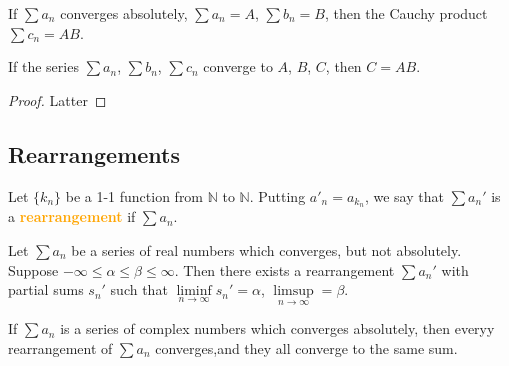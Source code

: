 \begin{theorem}
[pma 3.50]
If $\sum a_n$ converges absolutely, $\sum a_n=A$, $\sum b_n=B$, then the Cauchy product $\sum c_n=AB$.
\end{theorem}
\begin{hardproof}

\end{hardproof}

\begin{theorem}
[pma 3.51]
If the series $\sum a_n$, $\sum b_n$, $\sum c_n$ converge to $A$, $B$, $C$, then $C=AB$.
\end{theorem}
\begin{proof}
Latter
\end{proof}

\subsection{Rearrangements}

\begin{definition}
[pma 3.52]
Let $\{k_n\}$ be a 1-1 function from $\mathbb{N}$ to $\mathbb{N}$. Putting $a'_n=a_{k_n}$, we say that $\sum a_n'$ is a \textbf{\textcolor{orange}{rearrangement}} if $\sum a_n$.
\end{definition}


\begin{theorem}
[pma 3.54]
Let $\sum a_n$ be a series of real numbers which converges, but not absolutely. Suppose $-\infty\leq \alpha\leq \beta\leq \infty$. Then there exists a rearrangement $\sum a_n'$ with partial sums $s_n'$ such that $\liminf\limits_{n\to \infty}s_n'=\alpha$, $\limsup\limits_{n\to \infty}=\beta$.
\end{theorem}
\begin{hardproof}

\end{hardproof}

\begin{theorem}
[pma 3.55]
If $\sum a_n$ is a series of complex numbers which converges absolutely, then everyy rearrangement of $\sum a_n$ converges,and they all converge to the same sum.
\end{theorem}
\begin{hardproof}

\end{hardproof}

\clearpage